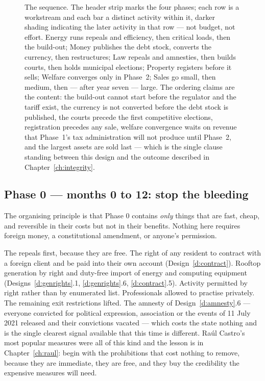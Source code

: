 \begin{figure}[t]
\caption{The sequence. The header strip marks the four phases; each row is a
workstream and each bar a distinct activity within it, darker shading indicating
the later activity in that row --- not budget, not effort. Energy runs repeals
and efficiency, then critical loads, then the build-out; Money publishes the
debt stock, converts the currency, then restructures; Law repeals and amnesties,
then builds courts, then holds municipal elections; Property registers before it
sells; Welfare converges only in Phase~2; Sales go small, then medium, then ---
after year seven --- large. The ordering claims are the content: the build-out
cannot start before the regulator and the tariff exist, the currency is not
converted before the debt stock is published, the courts precede the first
competitive elections, registration precedes any sale, welfare convergence waits
on revenue that Phase~1's tax administration will not produce until Phase~2, and
the largest assets are sold last --- which is the single clause standing between
this design and the outcome described in Chapter~\ref{ch:integrity}.}
\label{fig:sequence}
\end{figure}

\subsection*{Phase 0 --- months 0 to 12: stop the bleeding}

The organising principle is that Phase 0 contains \emph{only} things that are
fast, cheap, and reversible in their costs but not in their benefits. Nothing
here requires foreign money, a constitutional amendment, or anyone's permission.

The repeals first, because they are free. The right of any resident to contract
with a foreign client and be paid into their own account
(Design~\ref{d:contract}). Rooftop generation by right and duty-free import of
energy and computing equipment (Designs~\ref{d:genrights}.1, \ref{d:genrights}.6,
\ref{d:contract}.5). Activity permitted by right rather than by enumerated list.
Professionals allowed to practise privately. The remaining exit restrictions
lifted. The amnesty of Design~\ref{d:amnesty}.6 --- everyone convicted for
political expression, association or the events of 11 July 2021 released and
their convictions vacated --- which costs the state nothing and is the single
clearest signal available that this time is different. Ra\'ul Castro's most
popular measures were all of this kind and the lesson is in
Chapter~\ref{ch:raul}: begin with the prohibitions that cost nothing to remove,
because they are immediate, they are free, and they buy the credibility the
expensive measures will need.


